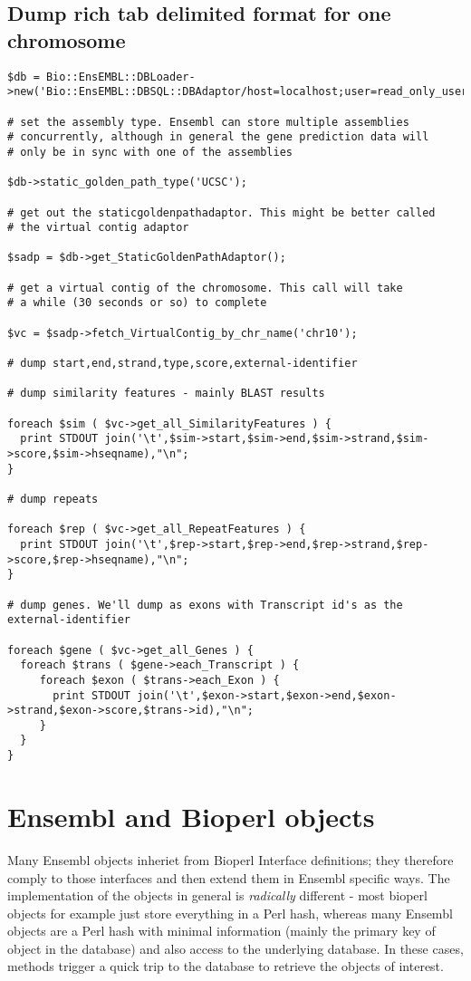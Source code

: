 \documentclass[11pt,a4paper]{article}
\begin{document}
\subsection{Dump rich tab delimited format for one chromosome}

\begin{verbatim}
$db = Bio::EnsEMBL::DBLoader->new('Bio::EnsEMBL::DBSQL::DBAdaptor/host=localhost;user=read_only_user;dbname=test_ensembl');

# set the assembly type. Ensembl can store multiple assemblies
# concurrently, although in general the gene prediction data will
# only be in sync with one of the assemblies

$db->static_golden_path_type('UCSC');

# get out the staticgoldenpathadaptor. This might be better called
# the virtual contig adaptor

$sadp = $db->get_StaticGoldenPathAdaptor();

# get a virtual contig of the chromosome. This call will take
# a while (30 seconds or so) to complete

$vc = $sadp->fetch_VirtualContig_by_chr_name('chr10');

# dump start,end,strand,type,score,external-identifier

# dump similarity features - mainly BLAST results

foreach $sim ( $vc->get_all_SimilarityFeatures ) {
  print STDOUT join('\t',$sim->start,$sim->end,$sim->strand,$sim->score,$sim->hseqname),"\n";
}

# dump repeats

foreach $rep ( $vc->get_all_RepeatFeatures ) {
  print STDOUT join('\t',$rep->start,$rep->end,$rep->strand,$rep->score,$rep->hseqname),"\n";
}

# dump genes. We'll dump as exons with Transcript id's as the external-identifier

foreach $gene ( $vc->get_all_Genes ) {
  foreach $trans ( $gene->each_Transcript ) {
     foreach $exon ( $trans->each_Exon ) {
       print STDOUT join('\t',$exon->start,$exon->end,$exon->strand,$exon->score,$trans->id),"\n";
     }
  }
}

\end{verbatim}

\section{Ensembl and Bioperl objects}

Many Ensembl objects inheriet from Bioperl Interface definitions; they
therefore comply to those interfaces and then extend them in Ensembl
specific ways. The implementation of the objects in general is
\emph{radically} different - most bioperl objects for example just
store everything in a Perl hash, whereas many Ensembl objects are a
Perl hash with minimal information (mainly the primary key of object
in the database) and also access to the underlying database. In these
cases, methods trigger a quick trip to the database to retrieve the
objects of interest.
\end{document}
